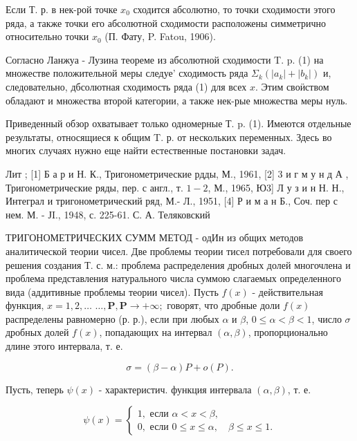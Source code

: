 \documentclass[10pt]{article}
\begin{document}
Если Т. р. в нек-рой точке $x_{0}$ сходится абсолютно, то точки сходимости этого ряда, а также точки его абсолютной сходимости расположены симметрично относительно точки $x_{0}$ (П. Фату, P. Fatou, 1906).



Согласно Ланжуа - Лузина теореме из абсолютной сходимости T. p. (1) на множестве положительной меры следуе' сходимость ряда $\Sigma_{k}\left(\left|a_{k}\right|+\left|b_{k}\right|\right)$ и, следовательно, дбсолютная сходимость ряда (1) для всех $x$. Этим своӥством обладают и множества второй категории, а также нек-рые множества меры нуль.



Приведенный обзор охватывает только одномерные Т. p. (1). Имеются отдельные результаты, относящиеся к общим T. р. от нескольких переменных. Здесь во многих случаях нужно еще найти естественные постановки задач.



Лит ; [1] Б а р и Н. К., Тригонометрические рдды, М., 1961, [2] 3 и г м у н д А , Тригонометрические ряды, пер. с англ., т. $1-2$, М., 1965, Ю3] Л у з и н Н. Н., Интеграл и тригонометрический ряд, М.- Л., 1951, [4] Р и м а н Б., Соч. пер с нем. М. - ЈI., 1948, с. 225-61. С. А. Теляковский



ТРИГОНОМЕТРИЧЕСКИХ СУММ МЕТОД - одИн из общих методов аналитической теории чисел. Две проблемы теории тисел потребовали для своего решения создания Т. с. м.: проблема распределения дробных долей многочлена и проблема представления натурального числа суммою слагаемых определенного вида (аддитивные проблемы теории чисел). Пусть $f(x)$ - действительная функция, $x=1,2, \ldots$ $\ldots, \boldsymbol{P}, \boldsymbol{P} \rightarrow+\infty ;$ говорят, что дробные доли $f(x)$ распределены равномерно (р. р.), если при любых $\alpha$ и $\beta$, $0 \leqslant \alpha<\beta<1$, число $\sigma$ дробных долей $f(x)$, попадающих на интервал $(\alpha, \beta)$, пропорционально длине этого интервала, т. е.



\[

\sigma=(\beta-\alpha) P+o(P) .

\]



Пусть, теперь $\psi(x)$ - характеристич. функция интервала $(\alpha, \beta)$, т. е.



\[

\psi(x)=\left\{\begin{array}{l}

1, \text { если } \alpha<x<\beta, \\

0, \text { если } 0 \leqslant x \leqslant \alpha, \quad \beta \leqslant x \leqslant 1 .

\end{array}\right.

\]
\end{document}
